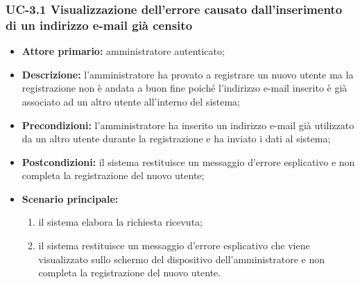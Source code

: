 \subsubsection{UC-3.1 Visualizzazione dell'errore causato dall'inserimento di un indirizzo e-mail già censito}
\begin{itemize}
	\item \textbf{Attore primario:} amministratore autenticato;

	\item \textbf{Descrizione:} l'amministratore ha provato a registrare un nuovo utente ma la registrazione non è andata a buon fine poiché l'indirizzo e-mail inserito è già associato ad un altro utente all'interno del sistema;

	\item \textbf{Precondizioni:} l'amministratore ha inserito un indirizzo e-mail già utilizzato da un altro utente durante la registrazione e ha inviato i dati al sistema;

	\item \textbf{Postcondizioni:} il sistema restituisce un messaggio d'errore esplicativo e non completa la registrazione del nuovo utente;

	\item \textbf{Scenario principale:}
	\begin{enumerate}
   		\item il sistema elabora la richiesta ricevuta;
    	\item il sistema restituisce un messaggio d'errore esplicativo che viene visualizzato sullo schermo del dispositivo dell'amministratore e non completa la registrazione del nuovo utente.
	\end{enumerate}
\end{itemize}

